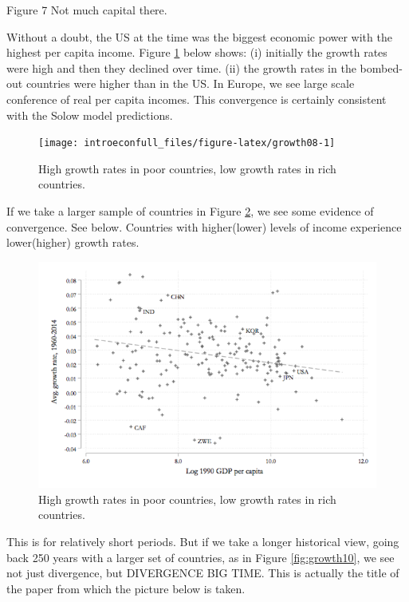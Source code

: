 \documentclass[
]{book}
\begin{document}
Figure 7 Not much capital there.

Without a doubt, the US at the time was the biggest economic power with the highest per capita income. Figure \ref{fig:growth08} below shows: (i) initially the growth rates were high and then they declined over time. (ii) the growth rates in the bombed-out countries were higher than in the US. In Europe, we see large scale conference of real per capita incomes. This convergence is certainly consistent with the Solow model predictions.

\begin{figure}

{\centering \texttt{[image: introeconfull\_files/figure-latex/growth08-1]} 

}

\caption{High growth rates in poor countries, low growth rates in rich countries.}\label{fig:growth08}
\end{figure}

If we take a larger sample of countries in Figure \ref{fig:growth09}, we see some evidence of convergence. See below. Countries with higher(lower) levels of income experience lower(higher) growth rates.

\begin{figure}

{\centering \includegraphics[width=1\linewidth]{img/growth/growth9} 

}

\caption{High growth rates in poor countries, low growth rates in rich countries.}\label{fig:growth09}
\end{figure}

This is for relatively short periods. But if we take a longer historical view, going back 250 years with a larger set of countries, as in Figure \ref{fig:growth10}, we see not just divergence, but DIVERGENCE BIG TIME. This is actually the title of the paper from which the picture below is taken.
\end{document}

